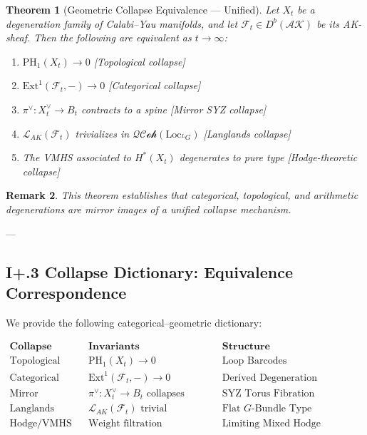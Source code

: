 \documentclass[11pt]{article}
\newtheorem{theorem}{Theorem}[section]
\newtheorem{remark}[theorem]{Remark}
\begin{document}
\begin{theorem}[Geometric Collapse Equivalence — Unified]
Let \( X_t \) be a degeneration family of Calabi–Yau manifolds, and let \( \mathcal{F}_t \in D^b(\mathcal{AK}) \) be its AK-sheaf. Then the following are equivalent as \( t \to \infty \):
\begin{enumerate}
  \item \( \mathrm{PH}_1(X_t) \to 0 \) \hfill [Topological collapse]
  \item \( \mathrm{Ext}^1(\mathcal{F}_t, -) \to 0 \) \hfill [Categorical collapse]
  \item \( \pi^\vee: X_t^\vee \to B_t \) contracts to a spine \hfill [Mirror SYZ collapse]
  \item \( \mathcal{L}_{AK}(\mathcal{F}_t) \) trivializes in \( \mathcal{QCoh}(\mathrm{Loc}_{^LG}) \) \hfill [Langlands collapse]
  \item The VMHS associated to \( H^*(X_t) \) degenerates to pure type \hfill [Hodge-theoretic collapse]
\end{enumerate}
\end{theorem}

\begin{remark}
This theorem establishes that categorical, topological, and arithmetic degenerations are mirror images of a unified collapse mechanism.
\end{remark}

---

\subsection*{I+.3 Collapse Dictionary: Equivalence Correspondence}

We provide the following categorical–geometric dictionary:

\[
\begin{array}{lll}
\textbf{Collapse Type} & \textbf{Invariants} & \textbf{Structure} \\
\hline
\text{Topological} & \mathrm{PH}_1(X_t) \to 0 & \text{Loop Barcodes} \\
\text{Categorical} & \mathrm{Ext}^1(\mathcal{F}_t, -) \to 0 & \text{Derived Degeneration} \\
\text{Mirror} & \pi^\vee: X_t^\vee \to B_t \text{ collapses} & \text{SYZ Torus Fibration} \\
\text{Langlands} & \mathcal{L}_{AK}(\mathcal{F}_t) \text{ trivial} & \text{Flat } G\text{-Bundle Type} \\
\text{Hodge/VMHS} & \text{Weight filtration degenerates} & \text{Limiting Mixed Hodge Structure} \\
\end{array}
\]
\end{document}
